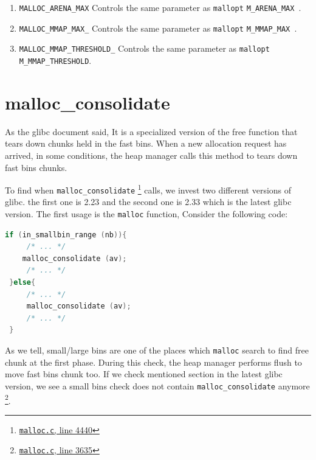 \documentclass{masterthesis}
\newcommand*\libc{glibc}
\newcommand*\fb{fast bins}
\newcommand*\lb{large bins}
\newcommand*\sbs{small bins}
\newcommand*\mallocc{\lstinline{malloc}\xspace}
\begin{document}
\begin{enumerate}
\item \lstinline{MALLOC_ARENA_MAX} Controls the same parameter as \lstinline{mallopt} \lstinline{M_ARENA_MAX }.

\item \lstinline{MALLOC_MMAP_MAX_} Controls the same parameter as  \lstinline{mallopt}  \lstinline{M_MMAP_MAX }.

\item \lstinline{MALLOC_MMAP_THRESHOLD_} Controls the same parameter as \lstinline{mallopt} \lstinline{M_MMAP_THRESHOLD}.
\end{enumerate}

\section{malloc\_consolidate}
\label{sect:mallocconsolidate}
As the \libc{} document said, It is a specialized version of the free function that tears down chunks held in the \fb{}. When a new allocation request has arrived, in some conditions, the heap manager calls this method to tears down \fb{} chunks.

To find when \lstinline{malloc_consolidate} \footnote{\href{https://sourceware.org/git/?p=glibc.git;a=blob;f=malloc/malloc.c;h=f7cd29bc2f93e1082ee77800bd64a4b2a2897055;hb=9ea3686266dca3f004ba874745a4087a89682617\#l4440}{\texttt{malloc.c}, line 4440}} calls, we invest two different versions of \libc{}. the first one is 2.23 and the second one is 2.33 which is the latest \libc{} version. The first usage is the \mallocc{} function, Consider the following code:

\begin{lstlisting}[language=c,frame=tlrb]
 if (in_smallbin_range (nb)){
	 /* ... */
 	malloc_consolidate (av);
	 /* ... */
 }else{
	 /* ... */
	 malloc_consolidate (av);
	 /* ... */
 }
\end{lstlisting}

As we tell, small/\lb{} are one of the places which \mallocc{} search to find free chunk at the first phase. During this check, the heap manager performs flush to move \fb{} chunk too. If we check mentioned section in the latest \libc{} version, we see a \sbs{} check does not contain \lstinline{malloc_consolidate} anymore \footnote{\href{https://sourceware.org/git/?p=glibc.git;a=blob;f=malloc/malloc.c;h=f7cd29bc2f93e1082ee77800bd64a4b2a2897055;hb=9ea3686266dca3f004ba874745a4087a89682617\#l3635}{\texttt{malloc.c}, line 3635}}.
\end{document}
